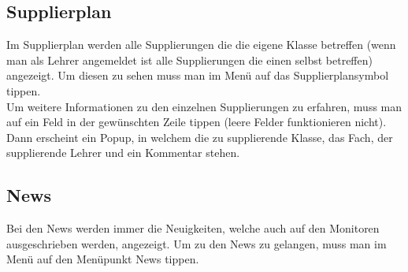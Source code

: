\subsection{Supplierplan}
Im Supplierplan werden alle Supplierungen die die eigene Klasse betreffen (wenn man als Lehrer angemeldet ist alle Supplierungen die einen selbst betreffen) angezeigt. Um diesen zu sehen muss man im Menü auf das Supplierplansymbol tippen.\\
Um weitere Informationen zu den einzelnen Supplierungen zu erfahren, muss man auf ein Feld in der gewünschten Zeile tippen (leere Felder funktionieren nicht). Dann erscheint ein Popup, in welchem die zu supplierende Klasse, das Fach, der supplierende Lehrer und ein Kommentar stehen.

\subsection{News}
Bei den News werden immer die Neuigkeiten, welche auch auf den Monitoren ausgeschrieben werden,  angezeigt. Um zu den News zu gelangen, muss man im Menü auf den Menüpunkt News tippen.
